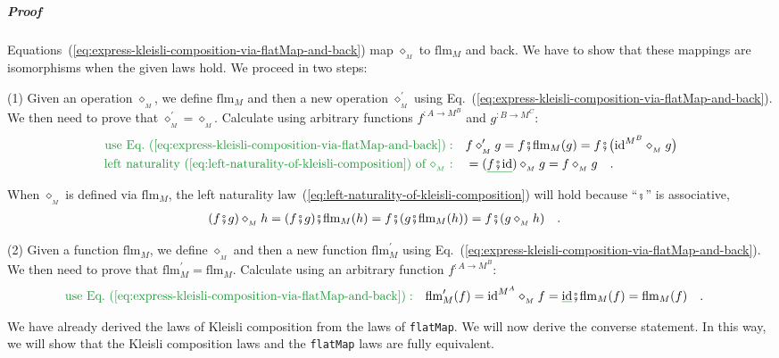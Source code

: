 \subparagraph{Proof}

Equations~(\ref{eq:express-kleisli-composition-via-flatMap-and-back})
map $\diamond_{_{M}}$ to $\text{flm}_{M}$ and back. We have to show
that these mappings are isomorphisms when the given laws hold. We
proceed in two steps:

(1) Given an operation $\diamond_{_{M}}$, we define $\text{flm}_{M}$
and then a new operation $\diamond_{_{M}}^{\prime}$ using Eq.~(\ref{eq:express-kleisli-composition-via-flatMap-and-back}).
We then need to prove that $\diamond_{_{M}}^{\prime}=\diamond_{_{M}}$.
Calculate using arbitrary functions $f^{:A\rightarrow M^{B}}$ and
$g^{:B\rightarrow M^{C}}$:
\begin{align*}
{\color{greenunder}\text{use Eq.~(\ref{eq:express-kleisli-composition-via-flatMap-and-back})}:}\quad & f\diamond_{_{M}}^{\prime}g=f\bef\text{flm}_{M}(g)=f\bef\big(\text{id}^{M^{B}}\diamond_{_{M}}g\big)\\
{\color{greenunder}\text{left naturality~(\ref{eq:left-naturality-of-kleisli-composition}) of }\diamond_{_{M}}:}\quad & =(\gunderline{f\bef\text{id}})\diamond_{_{M}}g=f\diamond_{_{M}}g\quad.
\end{align*}

When $\diamond_{_{M}}$ is defined via $\text{flm}_{M}$, the left
naturality law~(\ref{eq:left-naturality-of-kleisli-composition})
will hold because \textsf{``}$\bef$\textsf{''} is associative,
\begin{align*}
 & (f\bef g)\diamond_{_{M}}h=(f\bef g)\bef\text{flm}_{M}(h)=f\bef(g\bef\text{flm}_{M}(h))=f\bef(g\diamond_{_{M}}h)\quad.
\end{align*}

(2) Given a function $\text{flm}_{M}$, we define $\diamond_{_{M}}$
and then a new function $\text{flm}_{M}^{\prime}$ using Eq.~(\ref{eq:express-kleisli-composition-via-flatMap-and-back}).
We then need to prove that $\text{flm}_{M}^{\prime}=\text{flm}_{M}$.
Calculate using an arbitrary function $f^{:A\rightarrow M^{B}}$:
\begin{align*}
{\color{greenunder}\text{use Eq.~(\ref{eq:express-kleisli-composition-via-flatMap-and-back})}:}\quad & \text{flm}_{M}^{\prime}(f)=\text{id}^{M^{A}}\diamond_{_{M}}f=\gunderline{\text{id}}\bef\text{flm}_{M}(f)=\text{flm}_{M}(f)\quad.
\end{align*}

We have already derived the laws of Kleisli composition from the laws
of \lstinline!flatMap!. We will now derive the converse statement.
In this way, we will show that the Kleisli composition laws and the
\lstinline!flatMap! laws are fully equivalent.

